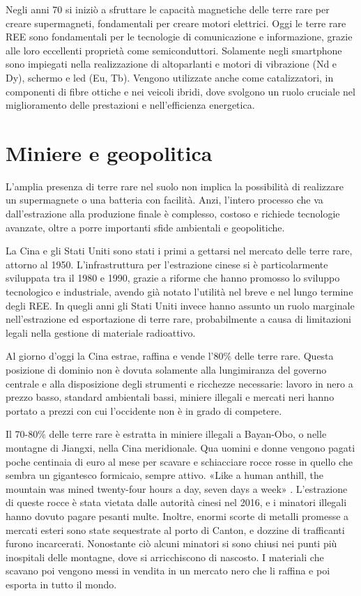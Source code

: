 \documentclass[12pt,a4paper,oneside]{book}
\begin{document}
Negli anni 70 si iniziò a sfruttare le capacità magnetiche delle terre rare per creare supermagneti, fondamentali per creare motori elettrici.
Oggi le terre rare REE sono fondamentali per le tecnologie di comunicazione e informazione, grazie alle loro eccellenti proprietà come semiconduttori. Solamente negli smartphone sono impiegati nella realizzazione di altoparlanti e motori di vibrazione (Nd e Dy), schermo e led (Eu, Tb). Vengono utilizzate anche come catalizzatori, in componenti di fibre ottiche e nei veicoli ibridi, dove svolgono un ruolo cruciale nel miglioramento delle prestazioni e nell'efficienza energetica.

\section{Miniere e geopolitica}
L'amplia presenza di terre rare nel suolo non implica la possibilità di realizzare un supermagnete o una batteria con facilità. Anzi, l'intero processo che va dall'estrazione alla produzione finale è complesso, costoso e richiede tecnologie avanzate, oltre a porre importanti sfide ambientali e geopolitiche.

La Cina e gli Stati Uniti sono stati i primi a gettarsi nel mercato delle terre rare, attorno al 1950. L'infrastruttura per l'estrazione cinese si è particolarmente sviluppata tra il 1980 e 1990, grazie a riforme che hanno promosso lo sviluppo tecnologico e industriale, avendo già notato l'utilità nel breve e nel lungo termine degli REE. In quegli anni gli Stati Uniti invece hanno assunto un ruolo marginale nell'estrazione ed esportazione di terre rare, probabilmente a causa di limitazioni legali nella gestione di materiale radioattivo.

Al giorno d'oggi la Cina estrae, raffina e vende l'80\% delle terre rare. Questa posizione di dominio non è dovuta solamente alla lungimiranza del governo centrale e alla disposizione degli strumenti e ricchezze necessarie: lavoro in nero a prezzo basso, standard ambientali bassi, miniere illegali e mercati neri hanno portato a prezzi con cui l'occidente non è in grado di competere. 

Il 70-80\% delle terre rare è estratta in miniere illegali a Bayan-Obo, o nelle montagne di Jiangxi, nella Cina meridionale. Qua uomini e donne vengono pagati poche centinaia di euro al mese per scavare e schiacciare rocce rosse in quello che sembra un gigantesco formicaio, sempre attivo.
«Like a human anthill, the mountain was mined twenty-four hours a day, seven days a week» \citep[p. 24]{pitron2020rare}.
L'estrazione di queste rocce è stata vietata dalle autorità cinesi nel 2016, e i minatori illegali hanno dovuto pagare pesanti multe. Inoltre, enormi scorte di metalli promesse a mercati esteri sono state sequestrate al porto di Canton, e dozzine di trafficanti furono incarcerati.
Nonostante ciò alcuni minatori si sono chiusi nei punti più inospitali delle montagne, dove si arricchiscono di nascosto. I materiali che scavano poi vengono messi in vendita in un mercato nero che li raffina e poi esporta in tutto il mondo.
\end{document}
